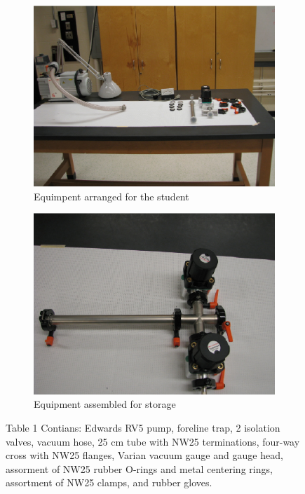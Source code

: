 \documentclass{book}
\begin{document}
\begin{figure}[H]
\centering
\begin{subfigure}{.5\textwidth} 
  \centering
  \includegraphics[width=0.95\linewidth]{Low-Vacuum-System-Table1-2}
  \caption{Equimpent arranged for the student} 
  \label{For Storage - Assembly of a Low Vacuum System}
\end{subfigure}%
\begin{subfigure}{.5\textwidth}
  \centering
  \includegraphics[width=0.95\linewidth]{Low-Vacuum-System-Assembled-Table1-2}
  \caption{Equipment assembled for storage}
  \label{For Student - Assembly of a Low Vacuum System} 
\end{subfigure}
\caption{Table 1 Contians: Edwards RV5 pump, foreline trap, 2 isolation valves, vacuum hose, 25 cm tube with NW25 terminations, four-way cross with NW25 flanges, Varian vacuum gauge and gauge head, assorment of NW25 rubber O-rings and metal centering rings, assortment of NW25 clamps, and rubber gloves.}
\label{fig:test}
\end{figure}
\end{document}
